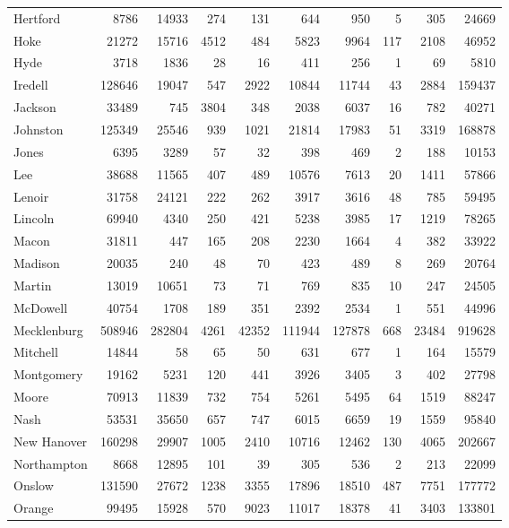 \documentclass[12pt,]{article}
\begin{document}
\begin{tabular}{lrrrrrrrrr}
\addlinespace
Hertford & 8786 & 14933 & 274 & 131 & 644 & 950 & 5 & 305 & 24669\\
Hoke & 21272 & 15716 & 4512 & 484 & 5823 & 9964 & 117 & 2108 & 46952\\
Hyde & 3718 & 1836 & 28 & 16 & 411 & 256 & 1 & 69 & 5810\\
Iredell & 128646 & 19047 & 547 & 2922 & 10844 & 11744 & 43 & 2884 & 159437\\
Jackson & 33489 & 745 & 3804 & 348 & 2038 & 6037 & 16 & 782 & 40271\\
\addlinespace
Johnston & 125349 & 25546 & 939 & 1021 & 21814 & 17983 & 51 & 3319 & 168878\\
Jones & 6395 & 3289 & 57 & 32 & 398 & 469 & 2 & 188 & 10153\\
Lee & 38688 & 11565 & 407 & 489 & 10576 & 7613 & 20 & 1411 & 57866\\
Lenoir & 31758 & 24121 & 222 & 262 & 3917 & 3616 & 48 & 785 & 59495\\
Lincoln & 69940 & 4340 & 250 & 421 & 5238 & 3985 & 17 & 1219 & 78265\\
\addlinespace
Macon & 31811 & 447 & 165 & 208 & 2230 & 1664 & 4 & 382 & 33922\\
Madison & 20035 & 240 & 48 & 70 & 423 & 489 & 8 & 269 & 20764\\
Martin & 13019 & 10651 & 73 & 71 & 769 & 835 & 10 & 247 & 24505\\
McDowell & 40754 & 1708 & 189 & 351 & 2392 & 2534 & 1 & 551 & 44996\\
Mecklenburg & 508946 & 282804 & 4261 & 42352 & 111944 & 127878 & 668 & 23484 & 919628\\
\addlinespace
Mitchell & 14844 & 58 & 65 & 50 & 631 & 677 & 1 & 164 & 15579\\
Montgomery & 19162 & 5231 & 120 & 441 & 3926 & 3405 & 3 & 402 & 27798\\
Moore & 70913 & 11839 & 732 & 754 & 5261 & 5495 & 64 & 1519 & 88247\\
Nash & 53531 & 35650 & 657 & 747 & 6015 & 6659 & 19 & 1559 & 95840\\
New Hanover & 160298 & 29907 & 1005 & 2410 & 10716 & 12462 & 130 & 4065 & 202667\\
\addlinespace
Northampton & 8668 & 12895 & 101 & 39 & 305 & 536 & 2 & 213 & 22099\\
Onslow & 131590 & 27672 & 1238 & 3355 & 17896 & 18510 & 487 & 7751 & 177772\\
Orange & 99495 & 15928 & 570 & 9023 & 11017 & 18378 & 41 & 3403 & 133801\\

\end{tabular}
\end{document}
